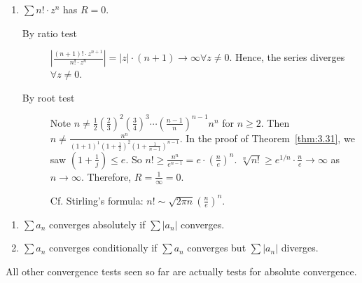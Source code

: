 \begin{example}
	\begin{enumerate}
		\item $\sum{n! \cdot z^{n}}$ has $R=0$.
		      \begin{description}
			      \item [By ratio test]
			            $\left| \frac{(n+1)! \cdot z^{n+1}}{n! \cdot z^{n}} \right|=|z|\cdot(n+1) \to \infty \forall z\neq 0$. Hence, the series diverges $\forall z \neq 0$.
			      \item[By root test]
			            Note $n\neq \frac{1}{2}(\frac{2}{3})^{2}(\frac{3}{4})^{3} \cdots (\frac{n-1}{n})^{n-1} n^{n}$ for $n\ge 2$.
			            Then $n\neq  \frac{n^{n}}{(1+1)^{1}(1+\frac{1}{2})^{2}(1+\frac{1}{n-1})^{n-1}}$. In the proof of Theorem~\ref{thm:3.31}, we saw $(1+\frac{1}{j})\le e$. So $n! \ge \frac{n^{n}}{e^{n-1}}=e \cdot (\frac{n}{e})^{n}$.
			            $\sqrt[n]{n!}\ge e^{1/n} \cdot \frac{n}{e} \to \infty$ as $n\to \infty$. Therefore, $R=\frac{1}{\infty}=0$.
			            \begin{note}
				            Cf. Stirling's formula: $n! \sim \sqrt{2\pi n} \left( \frac{n}{e} \right)^{n}$.
			            \end{note}
		      \end{description}
	\end{enumerate}
\end{example}
\begin{definition}
	\hfill
	\begin{enumerate}
		\item
		      $\sum{a_{n}}$ converges absolutely if $\sum{|a_{n}|}$ converges.
		\item $\sum{a_{n}}$ converges conditionally if $\sum{a_{n}}$ converges but $\sum{|a_{n}|}$ diverges.
	\end{enumerate}
	\hfill
	\begin{remark}
		All other convergence tests seen so far are actually tests for absolute convergence.
	\end{remark}
\end{definition}

